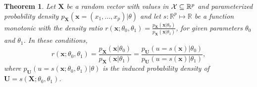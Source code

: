 \documentclass[12pt]{article}
\newcommand{\sstar}{s^*}
\numberwithin{equation}{section}
\theoremstyle{plain}
\newtheorem{theorem}{Theorem}
\begin{document}
%
%

\begin{theorem}
    \label{thm:ratio-equivalence}
    Let $\mathbf{X}$ be a random vector with values in ${\cal X} \subseteq \mathbb{R}^p$ and parameterized probability
    density $p_{\mathbf{X}}(\mathbf{x} = (x_1, ..., x_p)|\theta)$ and let
    $s : \mathbb{R}^p \mapsto \mathbb{R}$ be a function monotonic with the density ratio
    $r(\mathbf{x};\theta_0,\theta_1) = \frac{p_\mathbf{X}(\mathbf{x}|\theta_0)}{p_\mathbf{X}(\mathbf{x}|\theta_1)}$,
    for given parameters $\theta_0$ and $\theta_1$. In these conditions,
    \begin{equation}
        r(\mathbf{x};\theta_0,\theta_1) = \frac{p_\mathbf{X}(\mathbf{x}|\theta_0)}{p_\mathbf{X}(\mathbf{x}|\theta_1)} = \frac{p_\mathbf{U}(u=s(\mathbf{x})|\theta_0)}{p_\mathbf{U}(u=s(\mathbf{x})|\theta_1)},
    \end{equation}
    where $p_\mathbf{U}(u=s(\mathbf{x};\theta_0,\theta_1)|\theta)$ is the induced probability density of
    $\mathbf{U} = s(\mathbf{X};\theta_0,\theta_1)$.
\end{theorem}
\end{document}
